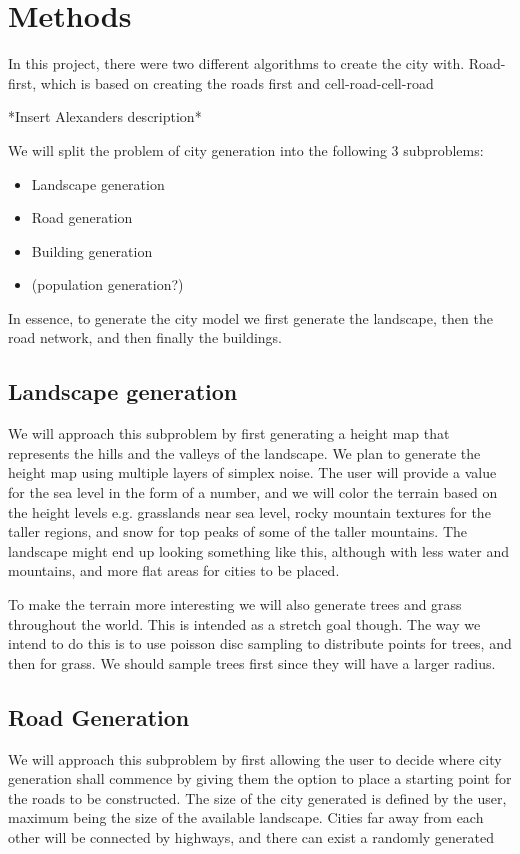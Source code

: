 \section{Methods}
\label{sec:methods}
In this project, there were two different algorithms to create the city with.
Road-first, which is based on creating the roads first and cell-road-cell-road 

*Insert Alexanders description* 

We will split the problem of city generation into the following 3 subproblems:
\begin{itemize}
  \item Landscape generation
  \item Road generation
  \item Building generation
  \item (population generation?)
\end{itemize}

In essence, to generate the city model we first generate the landscape, then the road network, and then finally the buildings. 

\subsection{Landscape generation}
We will approach this subproblem by first generating a height map that represents the hills and the valleys of the landscape.
We plan to generate the height map using multiple layers of simplex noise.
The user will provide a value for the sea level in the form of a number, and we will color the terrain based on the height levels e.g. grasslands near sea level, rocky mountain textures for the taller regions, and snow for top peaks of some of the taller mountains.
The landscape might end up looking something like this, although with less water and mountains, and more flat areas for cities to be placed.

To make the terrain more interesting we will also generate trees and grass throughout the world.
This is intended as a stretch goal though.
The way we intend to do this is to use poisson disc sampling to distribute points for trees, and then for grass. %
We should sample trees first since they will have a larger radius.

\subsection{Road Generation}
We will approach this subproblem by first allowing the user to decide where city generation shall commence by giving them the option to place a starting point for the roads to be constructed.
The size of the city generated is defined by the user, maximum being the size of the available landscape.
Cities far away from each other will be connected by highways, and there can exist a randomly generated 

